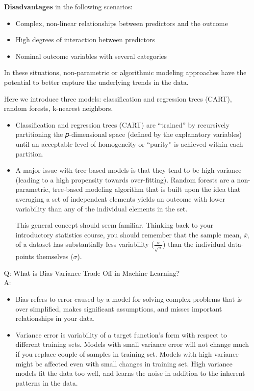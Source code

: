 \documentclass[
]{book}
\providecommand{\tightlist}{%
  \setlength{\itemsep}{0pt}\setlength{\parskip}{0pt}}
\begin{document}
\textbf{Disadvantages} in the following scenarios:

\begin{itemize}
\tightlist
\item
  Complex, non-linear relationships between predictors and the outcome
\item
  High degrees of interaction between predictors
\item
  Nominal outcome variables with several categories
\end{itemize}

In these situations, non-parametric or algorithmic modeling approaches have the potential to better capture the underlying trends in the data.

Here we introduce three models: classification and regression trees (CART), random forests, k-nearest neighbors.

\begin{itemize}
\item
  Classification and regression trees (CART) are ``trained'' by recursively partitioning the 𝑝-dimensional space (defined by the explanatory variables) until an acceptable level of homogeneity or ``purity'' is achieved within each partition.
\item
  A major issue with tree-based models is that they tend to be high variance (leading to a high propensity towards over-fitting). Random forests are a non-parametric, tree-based modeling algorithm that is built upon the idea that averaging a set of independent elements yields an outcome with lower variability than any of the individual elements in the set.

  This general concept should seem familiar. Thinking back to your introductory statistics course, you should remember that the sample mean, \(\overline{x}\), of a dataset has substantially less variability (\(\frac{\sigma}{\sqrt{n}}\)) than the individual data-points themselves (\(\sigma\)).
\end{itemize}

Q: What is Bias-Variance Trade-Off in Machine Learning?\\
A:

\begin{itemize}
\tightlist
\item
  Bias refers to error caused by a model for solving complex problems that is over simplified, makes significant assumptions, and misses important relationships in your data.
\item
  Variance error is variability of a target function's form with respect to different training sets. Models with small variance error will not change much if you replace couple of samples in training set. Models with high variance might be affected even with small changes in training set. High variance models fit the data too well, and learns the noise in addition to the inherent patterns in the data.
\end{itemize}
\end{document}
